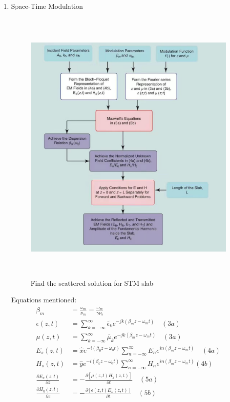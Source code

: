 \documentclass[]{article}
\begin{document}
\begin{enumerate}
\begin{enumerate}
	\clearpage
		\item Space-Time Modulation
		\begin{figure}[h]
			\centering
			\includegraphics[width=12cm,height=14cm]{Fig/SpacTimeModu.jpg}
			\caption{Find the scattered solution for STM slab}
		\end{figure}
	
		Equations mentioned:
		\begin{align*}
			\beta_m &= \frac{\omega_m}{\nu_m} = \frac{\omega_m}{\gamma\nu_b}\\
			\epsilon(z,t) &= \sum\limits_{k = -\infty}^{\infty}\tilde{\epsilon_k}e^{-jk(\beta_mz-\omega_mt)} \quad (3a)\\
			\mu(z,t) &= \sum\limits_{k = -\infty}^{\infty}\tilde{\mu_k}e^{-jk(\beta_mz-\omega_mt)} \quad (3a)\\
			E_s(z,t) &= \hat{x} e^{-i(\beta_0z - \omega_0t)}\sum\limits_{n = -\infty}^{\infty}E_ne^{in(\beta_mz-\omega_mt)} \quad (4a)\\
			H_s(z,t) &= \hat{y} e^{-i(\beta_0z - \omega_0t)}\sum\limits_{n = -\infty}^{\infty}H_ne^{in(\beta_mz-\omega_mt)} (4b)\\
			\frac{\partial E_x(z,t)}{\partial z} &= -\frac{\partial [\mu(z,t)H_y(z,t)]}{\partial t} \quad (5a)\\
			\frac{\partial H_y(z,t)}{\partial z} &= -\frac{\partial [\epsilon(z,t)E_x(z,t)]}{\partial t} \quad (5b)
		\end{align*}
		
		\end{enumerate}
	
	\end{enumerate}
	\clearpage
\end{document}
